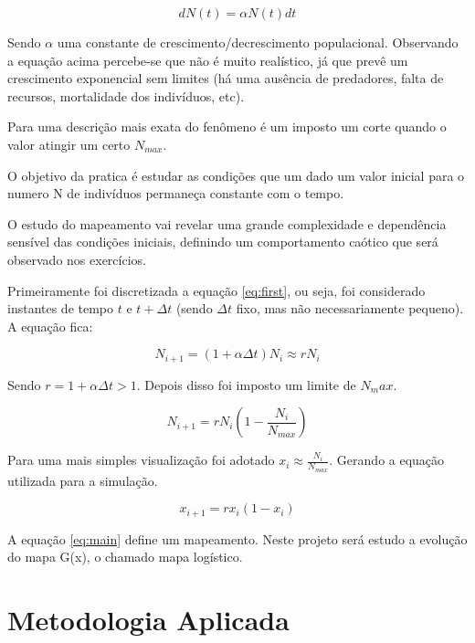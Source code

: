 \documentclass[a4paper, 12pt]{article}
\begin{document}
\begin{equation}
    d N(t) = \alpha N(t) dt
    \label{eq:first}
\end{equation}

Sendo $\alpha$ uma constante de crescimento/decrescimento populacional. Observando a equação acima percebe-se que não é muito realístico, já que prevê um crescimento exponencial sem limites (há uma ausência de predadores, falta de recursos, mortalidade dos indivíduos, etc).

Para uma descrição mais exata do fenômeno é um imposto um corte quando o valor atingir um certo $N_{max}$.

O objetivo da pratica é estudar as condições que um dado um valor inicial para o numero N de indivíduos permaneça constante com o tempo.


O estudo do mapeamento vai revelar uma grande complexidade e dependência sensível das condições iniciais, definindo um comportamento caótico que será observado nos exercícios.


Primeiramente foi discretizada a equação  \ref{eq:first}, ou seja, foi considerado instantes de tempo $t$ e $t + \Delta t$ (sendo $\Delta t$ fixo, mas não necessariamente pequeno). A equação fica:

\begin{equation}
    N_{i + 1} = (1 + \alpha \Delta t) N_i \approx r N_i
\end{equation}

Sendo $r = 1 + \alpha \Delta t > 1$. Depois disso foi imposto um limite de $N_max$.

\begin{equation}
    N_{i + 1} = r N_i ( 1 - \frac{N_i}{N_{max}} )
\end{equation}

Para uma mais simples visualização foi adotado $x_i \approx \frac{N_i}{N_{max}}$. Gerando a equação utilizada para a simulação.

\begin{equation}
    x_{i + 1} = r x_i (1 - x_i)
    \label{eq:main}
\end{equation}

A equação \ref{eq:main} define um mapeamento. Neste projeto será estudo a evolução do mapa G(x), o chamado mapa logístico.

\section{Metodologia Aplicada}
\end{document}
